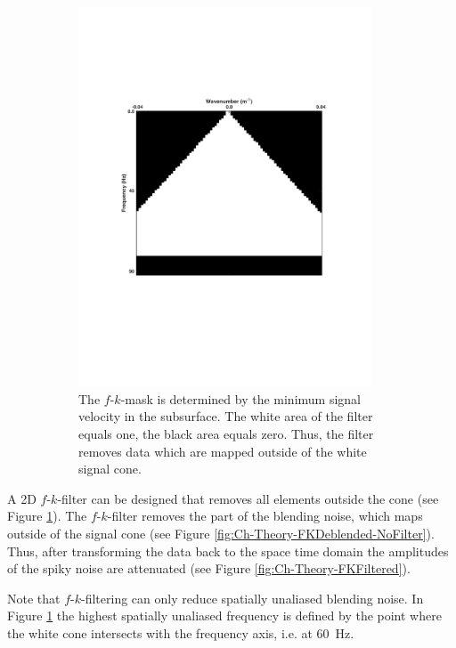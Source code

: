 \begin{figure}
\begin{subfigure}[t]{0.45\textwidth}
		\includegraphics[width = 0.957\textwidth]{Plots/Mahdad/5iter/FK-MaskCRG_rec30}
		\caption{The $f$-$k$-mask is determined by the minimum signal velocity in the subsurface. The white area of the filter equals one, the black area equals zero. Thus, the filter removes data which are mapped outside of the white signal cone.}
		\label{fig:Ch-Theory-FK-Mask}
	\end{subfigure}
	
	\caption{}
	\label{fig:Ch-Theory-fk-unblended-data-mask}
\end{figure}

A 2D $f$-$k$-filter can be designed that removes all elements outside the cone (see Figure \ref{fig:Ch-Theory-FK-Mask}). The $f$-$k$-filter removes the part of the blending noise, which maps outside of the signal cone (see Figure \ref{fig:Ch-Theory-FKDeblended-NoFilter}). Thus, after transforming the data back to the space time domain the amplitudes of the spiky noise are attenuated (see Figure \ref{fig:Ch-Theory-FKFiltered}). 

Note that $f$-$k$-filtering can only reduce spatially unaliased blending noise. In Figure \ref{fig:Ch-Theory-FK-Mask} the highest spatially unaliased frequency is defined by the point where the white cone intersects with the frequency axis, i.e. at \SI{60}{\hertz}. 


